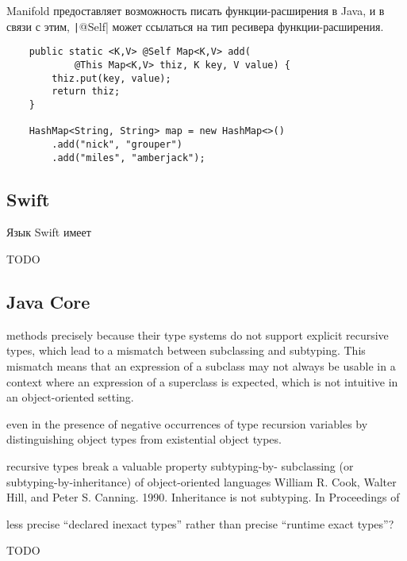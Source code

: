 Manifold предоставляет возможность писать функции-расширения в Java, и в связи с этим, \texttt|@Self| может ссылаться на тип ресивера функции-расширения.

\begin{verbatim}
    public static <K,V> @Self Map<K,V> add(
            @This Map<K,V> thiz, K key, V value) {
        thiz.put(key, value);
        return thiz;
    }

    HashMap<String, String> map = new HashMap<>()
        .add("nick", "grouper")
        .add("miles", "amberjack");
\end{verbatim}


\subsection{Swift}

Язык Swift имеет

TODO %


\subsection{Java Core}

methods precisely because their type systems
do not support explicit recursive types, which lead to a mismatch between subclassing and subtyping. This
mismatch means that an expression of a subclass may not always be usable in a context where an expression
of a superclass is expected, which is not intuitive in an object-oriented setting.

even in the presence of negative occurrences of type
recursion variables by distinguishing object types from existential object types.

recursive types break a valuable property subtyping-by-
subclassing (or subtyping-by-inheritance) of object-oriented languages
William R. Cook, Walter Hill, and Peter S. Canning. 1990. Inheritance is not subtyping. In Proceedings of

less precise “declared inexact types” rather than precise “runtime
exact types”?

TODO %

\cite{ryu2016thistype}
